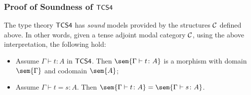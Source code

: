 \subsubsection{Proof of Soundness of $\sf{TCS4}$}
\label{subsec:proof_of_soundness_of_tcs4}

\begin{theorem*}
The type theory $\sf{TCS4}$ has \textit{sound} models provided by the
structures $\cal C$ defined above.  In other words, given a tense
adjoint modal category $\cal C$, using the above interpretation, the
following hold:
\begin{itemize}
\item Assume $\Gamma \vdash t : A$ in $\sf{TCS4}$. Then $\sem{\Gamma
  \vdash t \colon A}$ is a morphism with domain $\sem{\Gamma}$ and
  codomain $\sem{A}$;
\item Assume $\Gamma \vdash t = s \colon A$. Then $\sem{\Gamma
  \vdash t \colon A} = \sem{\Gamma \vdash s \colon A}$.
\end{itemize}
\end{theorem*}
